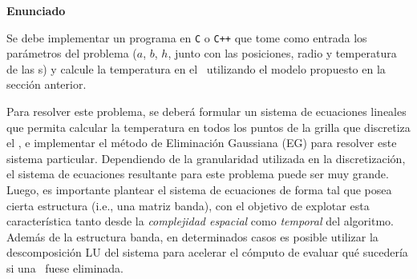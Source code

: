 {\noindent \bf Enunciado}

Se debe implementar un programa en \verb+C+ o \verb-C++- que tome como entrada los par\'ametros del problema ($a$, $b$, $h$, junto con las posiciones, radio y temperatura de las \atacante s) y calcule la temperatura en el \objeto\ utilizando el modelo propuesto en la secci\'on anterior.

Para resolver este problema, se deber\'a formular un sistema de ecuaciones lineales que permita calcular la temperatura en todos los puntos de la grilla que discretiza el \objeto, e implementar el m\'etodo de Eliminaci\'on Gaussiana (EG) para resolver este sistema particular. Dependiendo de la granularidad utilizada en la discretizaci\'on, el sistema de ecuaciones resultante para este problema puede ser muy grande. Luego, es importante plantear el sistema de ecuaciones de forma tal que posea cierta estructura (i.e., una matriz banda), con el objetivo de explotar esta caracter\'istica tanto desde la \emph{complejidad espacial} como \emph{temporal} del algoritmo. Adem\'as de la estructura banda, en determinados casos es posible utilizar la descomposici\'on LU del sistema para acelerar el cómputo de evaluar qu\'e suceder\'ia si una \atacante\ fuese eliminada.

